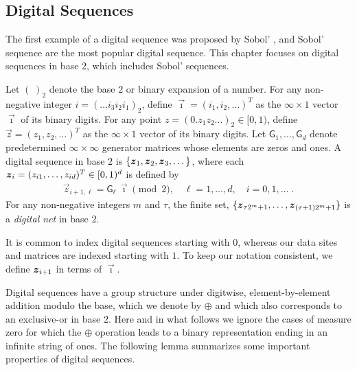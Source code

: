 \documentclass[graybox,footinfo]{svmult}
\begin{document}
\subsection{Digital Sequences} \label{FJ:sec:sobol}


The first example of a digital sequence was proposed by Sobol' \cite{Sob67}, and  Sobol' sequence are the most popular digital sequence. This chapter focuses on digital sequences in base $2$, which includes Sobol' sequences. 

\begin{definition} \label{FJ:def:digitalseq}  Let  ${(\;)}_2$ denote the base $2$ or binary expansion of a number.
	For any non-negative integer $i = (\dots i_3 i_2 i_1)_2$, define $\overrightarrow{\imath} = (i_1, i_2, \dots)^T$ as the $\infty \times 1$ vector $\overrightarrow{\imath}$ of its binary digits. 
	For any point $z = ({0.z_1 z_2 \dots })_2 \in [0, 1)$, define $\overrightarrow{z} = (z_1, z_2, \dots)^T$ as the $\infty \times 1$ vector of its binary digits. 
	Let $ \mathsf{G}_1, \dots , \mathsf{G}_d$ denote predetermined $\infty \times \infty$ generator matrices whose elements are zeros and ones. 
	A digital sequence in base $2$ is $\{{\boldsymbol{z}}_1, {\boldsymbol{z}}_2, {\boldsymbol{z}}_3, \dots\}$, where each ${\boldsymbol{z}}_i = ( z_{i1}, \dots , z_{id})^T \in [0, 1)^d$ is defined by
	\begin{align*}
	\overrightarrow{z}_{i+1,\ell} = \mathsf{G}_{\ell} \, \overrightarrow{\imath} \pmod 2,  \quad \ell = 1, \dots, d, \quad i = 0, 1, \dots \;.
	\end{align*}
For any non-negative integers $m$ and $\tau$, the finite set, $\{{\boldsymbol{z}}_{\tau 2^m +1}, \ldots, {\boldsymbol{z}}_{(\tau+1)2^m +1}\}$ is a \emph{digital net} in base $2$.
\end{definition}

It is common to index digital sequences starting with $0$, whereas our data sites and matrices  are indexed starting with $1$.  To keep our notation consistent, we define ${\boldsymbol{z}}_{i+1}$ in terms of $\overrightarrow{\imath}$.

Digital sequences have a group structure under digitwise, element-by-element addition modulo the base, which we denote by $\oplus$ and which also corresponds to an exclusive-or in base $2$. Here and in what follows we ignore the cases of measure zero for which the $\oplus$ operation leads to a binary representation ending in an infinite string of ones.  The following lemma summarizes some important properties of digital sequences. 
\end{document}
